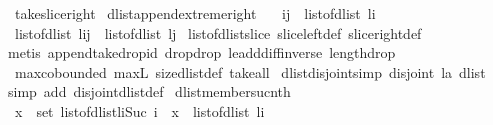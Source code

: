 \begin{isabellebody}
\ \ take{\isacharunderscore}slice{\isacharunderscore}right{\isacharparenright}%
\endisatagproof
{\isafoldproof}%
%
\isadelimproof
\isanewline
%
\endisadelimproof
\isanewline
{}\isamarkupfalse%
\ dlist{\isacharunderscore}append{\isacharunderscore}extreme{\isacharunderscore}right{\isacharcolon}\ \isanewline
\ \ {\isachardoublequoteopen}i{\isasymle}j\ {\isasymLongrightarrow}\ list{\isacharunderscore}of{\isacharunderscore}dlist\ {\isacharparenleft}l{\isasymdagger}i{\isachardot}{\isachardot}{\isacharparenright}\ {\isacharequal}\ \isanewline
\ \ {\isacharparenleft}list{\isacharunderscore}of{\isacharunderscore}dlist\ {\isacharparenleft}l{\isasymdagger}i{\isachardot}{\isachardot}j{\isacharparenright}{\isacharparenright}\ {\isacharat}\ {\isacharparenleft}list{\isacharunderscore}of{\isacharunderscore}dlist\ {\isacharparenleft}l{\isasymdagger}j{\isachardot}{\isachardot}{\isacharparenright}{\isacharparenright}{\isachardoublequoteclose}\isanewline
%
\isadelimproof
%
\endisadelimproof
%
\isatagproof
{}\isamarkupfalse%
\ list{\isacharunderscore}of{\isacharunderscore}dlist{\isacharunderscore}slice\ slice{\isacharunderscore}left{\isacharunderscore}def\ slice{\isacharunderscore}right{\isacharunderscore}def\isanewline
{}\isamarkupfalse%
\ {\isacharparenleft}metis\ append{\isacharunderscore}take{\isacharunderscore}drop{\isacharunderscore}id\ drop{\isacharunderscore}drop\ le{\isacharunderscore}add{\isacharunderscore}diff{\isacharunderscore}inverse{}\ length{\isacharunderscore}drop\ \isanewline
\ \ max{\isachardot}cobounded{}\ max{\isacharunderscore}{}L\ size{\isacharunderscore}dlist{\isacharunderscore}def\ take{\isacharunderscore}all{\isacharparenright}%
\endisatagproof
{\isafoldproof}%
%
\isadelimproof
\isanewline
%
\endisadelimproof
\isanewline
{}\isamarkupfalse%
\ dlist{\isacharunderscore}disjoint{\isacharbrackleft}simp{\isacharbrackright}{\isacharcolon}\ {\isachardoublequoteopen}disjoint\ {\isacharparenleft}l{\isacharcolon}{\isacharcolon}{\isacharprime}a\ dlist{\isacharparenright}{\isachardoublequoteclose}\isanewline
%
\isadelimproof
%
\endisadelimproof
%
\isatagproof
{}\isamarkupfalse%
\ {\isacharparenleft}simp\ add{\isacharcolon}\ disjoint{\isacharunderscore}dlist{\isacharunderscore}def{\isacharparenright}%
\endisatagproof
{\isafoldproof}%
%
\isadelimproof
\isanewline
%
\endisadelimproof
\isanewline
{}\isamarkupfalse%
\ dlist{\isacharunderscore}member{\isacharunderscore}suc{\isacharunderscore}nth{}{\isacharcolon}\ \isanewline
\ \ {\isachardoublequoteopen}x\ {\isasymin}\ set\ {\isacharparenleft}list{\isacharunderscore}of{\isacharunderscore}dlist{\isacharparenleft}l{\isasymdagger}i{\isachardot}{\isachardot}{\isacharparenleft}Suc\ i{\isacharparenright}{\isacharparenright}{\isacharparenright}\ {\isasymLongrightarrow}\ x\ {\isacharequal}\ {\isacharparenleft}list{\isacharunderscore}of{\isacharunderscore}dlist\ l{\isacharparenright}{\isacharbang}i{\isachardoublequoteclose}\isanewline

\end{isabellebody}
